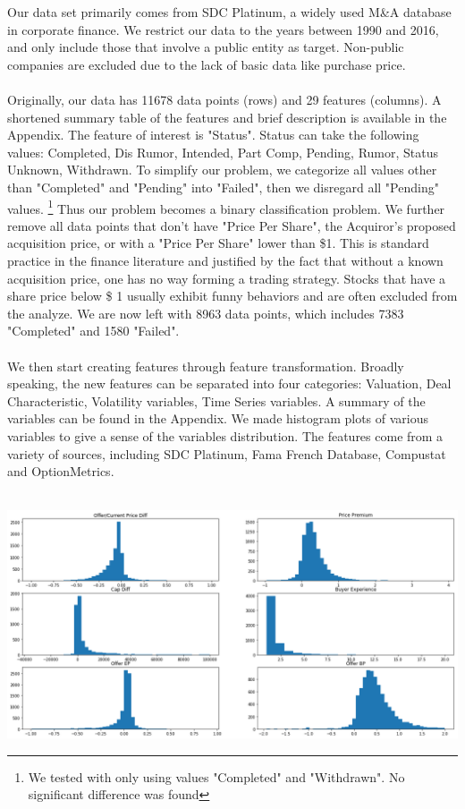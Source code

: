 \documentclass[12pt]{article}
\begin{document}
Our data set primarily comes from SDC Platinum, a widely used M\&A database in corporate finance. We restrict our data to the years between 1990 and 2016, and only include those that involve a public entity as target. Non-public companies are excluded due to the lack of basic data like purchase price.
\\
\\
Originally, our data has 11678 data points (rows) and 29 features (columns). A shortened summary table of the features and brief description is available in the Appendix. The feature of interest is "Status". Status can take the following values: Completed, Dis Rumor, Intended, Part Comp, Pending, Rumor, Status Unknown, Withdrawn. To simplify our problem, we categorize all values other than "Completed" and "Pending" into "Failed", then we disregard all "Pending" values. \footnote{We tested with only using values "Completed" and "Withdrawn". No significant difference was found} Thus our problem becomes a binary classification problem. We further remove all data points that don't have "Price Per Share", the Acquiror's proposed acquisition price, or with a "Price Per Share" lower than \$1. This is standard practice in the finance literature and justified by the fact that without a known acquisition price, one has no way forming a trading strategy. Stocks that have a share price below \$ 1 usually exhibit funny behaviors and are often excluded from the analyze. We are now left with 8963 data points, which includes 7383 "Completed" and 1580 "Failed".
\\
\\
We then start creating features through feature transformation. Broadly speaking, the new features can be separated into four categories: Valuation, Deal Characteristic, Volatility variables, Time Series variables. A summary of the variables can be found in the Appendix. We made histogram plots of various variables to give a sense of the variables distribution. The features come from a variety of sources, including SDC Platinum, Fama French Database, Compustat and OptionMetrics.
\\
\\

\begin{center}
\includegraphics[scale=0.32]{hist.png} 
\end{center}
\end{document}
